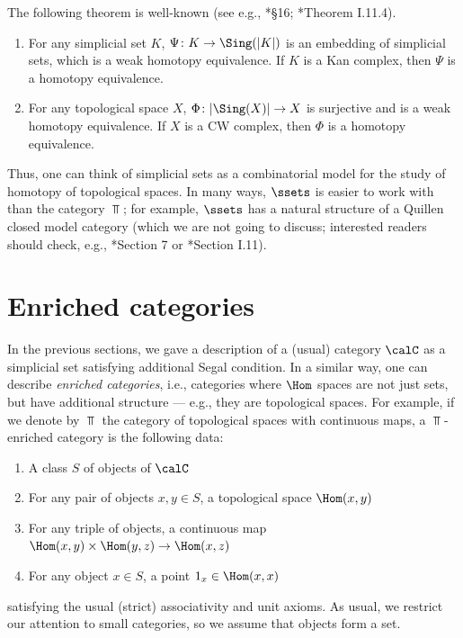 The following theorem is well-known (see e.g., *{\S 16};
*{Theorem I.11.4}).
\begin{theorem} \label{t:sset-top}
\par\noindent
  \begin{enumerate}
    \item For any simplicial set $K$, $\Psi\colon K\to \Sing(|K|)$ is an
      embedding of simplicial sets, which is a weak homotopy equivalence.
      If $K$ is a Kan complex, then $\Psi$ is a homotopy equivalence.
    \item
      For any topological space $X$, $\Phi\colon |\Sing(X)|\to X$ is surjective
      and is a weak homotopy equivalence. If $X$ is a CW complex, then $\Phi$
      is a homotopy equivalence.
  \end{enumerate}
\end{theorem}

Thus, one can think of simplicial sets as a combinatorial model for the study of
homotopy of topological spaces. In many ways, $\ssets$ is easier to work with
than the category $\Top$; for example, $\ssets$ has a natural structure of a
Quillen closed model category (which we are not going to discuss; interested
readers should check, e.g., *{Section 7} or
*{Section I.11}).



\section{Enriched categories}\label{s:enriched-cat}

In the previous sections, we gave a description of a (usual) category $\calC$ as
a simplicial set satisfying additional Segal condition. In a similar way, one
can describe \emph{enriched categories}, i.e., categories where $\Hom$ spaces
are not just sets, but have additional structure --- e.g., they are topological
spaces. For example, if we denote by $\Top$ the category of topological spaces
with continuous maps, a $\Top$-enriched category is the following data:
\begin{enumerate}
\item A class $S$ of objects of $\calC$
\item For any pair of objects $x,y\in S$, a topological space
  $\Hom(x,y)$
\item For any triple of objects, a continuous map
      $\Hom(x,y)\times \Hom(y,z)\to \Hom(x,z)$
\item For any object $x\in S$, a point $1_x\in \Hom(x,x)$
\end{enumerate}
satisfying the usual (strict) associativity and unit axioms. As usual, we
restrict our attention to small categories, so we assume that objects form a
set.

